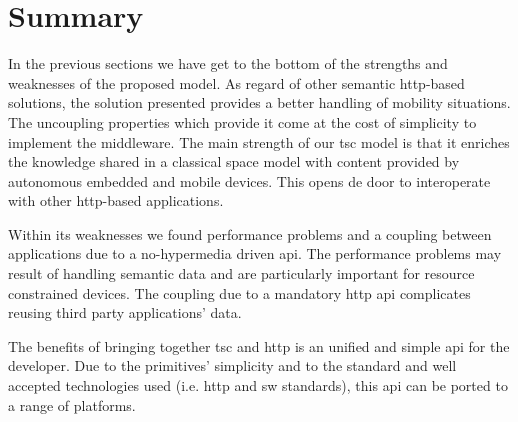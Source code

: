 \section{Summary}

In the previous sections we have get to the bottom of the strengths and weaknesses of the proposed model.
As regard of other semantic \ac{http}-based solutions, the solution presented provides a better handling of mobility situations. %
The uncoupling properties which provide it come at the cost of simplicity to implement the middleware.
The main strength of our \ac{tsc} model is that it enriches the knowledge shared in a classical space model with content provided by autonomous embedded and mobile devices.
This opens de door to interoperate with other \ac{http}-based applications.


Within its weaknesses we found performance problems and a coupling between applications due to a no-hypermedia driven \ac{api}.
The performance problems may result of handling semantic data and are particularly important for resource constrained devices.
The coupling due to a mandatory \ac{http} \ac{api} complicates reusing third party applications' data.


The benefits of bringing together \ac{tsc} and \ac{http} is an unified and simple \ac{api} for the developer. %
Due to the primitives' simplicity and to the standard and well accepted technologies used (i.e. \ac{http} and \ac{sw} standards), this \ac{api} can be ported to a range of platforms.